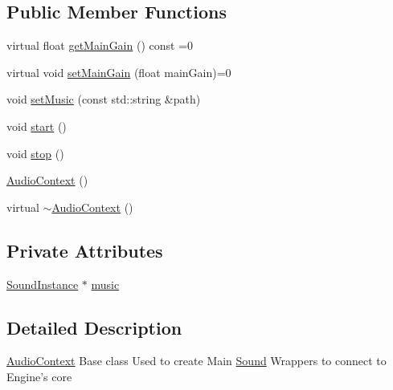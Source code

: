 \subsection*{Public Member Functions}
\begin{DoxyCompactItemize}
\item 
virtual float \hyperlink{classZeta_1_1AudioContext_ab492d715ae780a8d6c2fc4e7a0432355}{get\+Main\+Gain} () const =0
\item 
virtual void \hyperlink{classZeta_1_1AudioContext_af861f3797591e2c62040a18b3d4daa51}{set\+Main\+Gain} (float main\+Gain)=0
\item 
void \hyperlink{classZeta_1_1AudioContext_a56c0028bdeadb4901aede192f2af115a}{set\+Music} (const std\+::string \&path)
\item 
void \hyperlink{classZeta_1_1AudioContext_a99eaeb4a6af9c515c02eaaf406592833}{start} ()
\item 
void \hyperlink{classZeta_1_1AudioContext_a839246cbcf16e65920ad1a5bad31bd22}{stop} ()
\item 
\hyperlink{classZeta_1_1AudioContext_a6eacef723378137c0e758a320ee21d7a}{Audio\+Context} ()
\item 
virtual \hyperlink{classZeta_1_1AudioContext_a963fbc68f296d7f7b96c2e51799e8855}{$\sim$\+Audio\+Context} ()
\end{DoxyCompactItemize}
\subsection*{Private Attributes}
\begin{DoxyCompactItemize}
\item 
\hyperlink{classZeta_1_1SoundInstance}{Sound\+Instance} $\ast$ \hyperlink{classZeta_1_1AudioContext_aae43d48fd2d78a63baaf534d7df56481}{music}
\end{DoxyCompactItemize}


\subsection{Detailed Description}
\hyperlink{classZeta_1_1AudioContext}{Audio\+Context} Base class Used to create Main \hyperlink{classZeta_1_1Sound}{Sound} Wrappers to connect to Engine's core 

